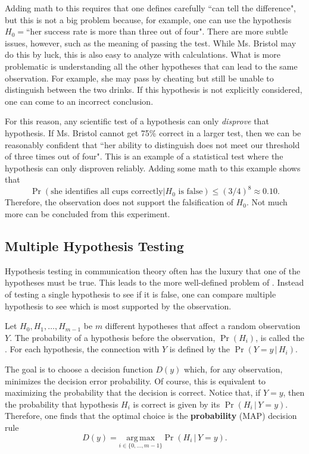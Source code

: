 Adding math to this requires that one defines carefully ``can tell the difference", but this is not a big problem because, for example, one can use the hypothesis $H_0=$``her success rate is more than three out of four".
There are more subtle issues, however, such as the meaning of passing the test.
While Ms. Bristol may do this by luck, this is also easy to analyze with calculations.
What is more problematic is understanding all the other hypotheses that can lead to the same observation.
For example, she may pass by cheating but still be unable to distinguish between the two drinks.
If this hypothesis is not explicitly considered, one can come to an incorrect conclusion.

For this reason, any scientific test of a hypothesis can only \emph{disprove} that hypothesis.
If Ms. Bristol cannot get 75\% correct in a larger test, then we can be reasonably confident that ``her ability to distinguish does not meet our threshold of three times out of four".
This is an example of a  statistical test where the hypothesis can only disproven reliably.
Adding some math to this example shows that
\[ \Pr (\text{she identifies all cups correctly} | H_0 \text{ is false}) \leq (3/4)^8 \approx 0.10. \]
Therefore, the observation does not support the falsification of $H_0$.
Not much more can be concluded from this experiment.

\subsection{Multiple Hypothesis Testing}

Hypothesis testing in communication theory often has the luxury that one of the hypotheses must be true.
This leads to the more well-defined problem of .
Instead of testing a single hypothesis to see if it is false, one can compare multiple hypothesis to see which is most supported by the observation.

Let $H_0,H_1,\ldots,H_{m-1}$ be $m$ different hypotheses that affect a random observation $Y$.
The probability of a hypothesis before the observation, $\Pr(H_i)$, is called the .
For each hypothesis, the connection with $Y$ is defined by the  $\Pr (Y=y \, | \, H_i)$.

The goal is to choose a decision function $D(y)$ which, for any observation, minimizes the decision error probability.
Of course, this is equivalent to maximizing the probability that the decision is correct.
Notice that, if $Y=y$, then the probability that hypothesis $H_i$ is correct is given by its  $\Pr (H_i \, | \, Y=y )$.
Therefore, one finds that the optimal choice is the  \textbf{probability} (MAP) decision rule 
\[ D(y) = \underset{i\in\{0,\ldots,m-1\}}{\mathrm{arg\,max}} \Pr( H_i \, |  \, Y=y). \]

